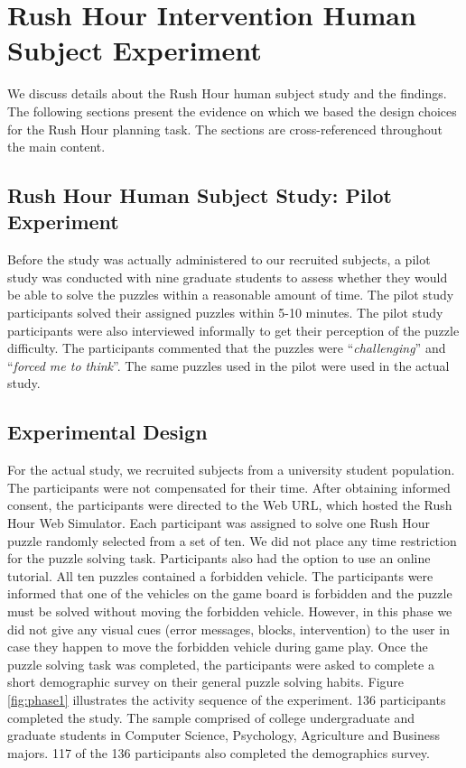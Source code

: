 \chapter{Rush Hour Intervention Human Subject Experiment}
\label{apx:rushintervention}
We discuss details about the Rush Hour human subject study and the findings. The following sections present the evidence on which we based the design choices for the Rush Hour planning task. The sections are cross-referenced throughout the main content.

\section{Rush Hour Human Subject Study: Pilot Experiment}
\label{ap:pilot}
Before the study was actually administered to our recruited subjects, a pilot study was conducted with nine graduate students to assess whether they would be able to solve the puzzles within a reasonable amount of time. The pilot study participants solved their assigned puzzles within 5-10 minutes. The pilot study participants were also interviewed informally to get their perception of the puzzle difficulty. The participants commented that the puzzles were ``\textit{challenging}'' and ``\textit{forced me to think}''. The same puzzles used in the pilot were used in the actual study.\\

\section{Experimental Design}
\label{ap:phase1design}
For the actual study, we recruited subjects from a university student population. 
The participants were not compensated for their time. 
After obtaining informed consent, the participants were directed to the Web URL, which hosted the Rush Hour Web Simulator. 
Each participant was assigned to solve one Rush Hour puzzle randomly selected from a set of ten. 
We did not place any time restriction for the puzzle solving task. 
Participants also had the option to use an online tutorial. 
All ten puzzles contained a forbidden vehicle. 
The participants were informed that one of the vehicles on the game board is forbidden and the puzzle must be solved without moving the forbidden vehicle. 
However, in this phase we did not give any visual cues (error messages, blocks, intervention) to the user in case they happen to move the forbidden vehicle during game play. 
Once the puzzle solving task was completed, the participants were asked to complete a short demographic survey on their general puzzle solving habits. 
Figure \ref{fig:phase1} illustrates the activity sequence of the experiment. 136 participants completed the study. The sample comprised of college undergraduate and graduate students in Computer Science, Psychology, Agriculture and Business majors. 117 of the 136 participants also completed the demographics survey.

